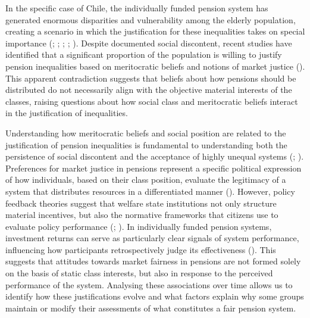 \documentclass[
  12pt,
]{article}
\begin{document}
In the specific case of Chile, the individually funded pension system
has generated enormous disparities and vulnerability among the elderly
population, creating a scenario in which the justification for these
inequalities takes on special importance
(;
; ;
;
). Despite documented social discontent,
recent studies have identified that a significant proportion of the
population is willing to justify pension inequalities based on
meritocratic beliefs and notions of market justice
(). This apparent contradiction suggests that beliefs about how
pensions should be distributed do not necessarily align with the
objective material interests of the classes, raising questions about how
social class and meritocratic beliefs interact in the justification of
inequalities.

Understanding how meritocratic beliefs and social position are related
to the justification of pension inequalities is fundamental to
understanding both the persistence of social discontent and the
acceptance of highly unequal systems
(;
). Preferences for
market justice in pensions represent a specific political expression of
how individuals, based on their class position, evaluate the legitimacy
of a system that distributes resources in a differentiated manner
().
However, policy feedback theories suggest that welfare state
institutions not only structure material incentives, but also the
normative frameworks that citizens use to evaluate policy performance
(;
). In individually funded
pension systems, investment returns can serve as particularly clear
signals of system performance, influencing how participants
retrospectively judge its effectiveness
(). This suggests that
attitudes towards market fairness in pensions are not formed solely on
the basis of static class interests, but also in response to the
perceived performance of the system. Analysing these associations over
time allows us to identify how these justifications evolve and what
factors explain why some groups maintain or modify their assessments of
what constitutes a fair pension system.
\end{document}
